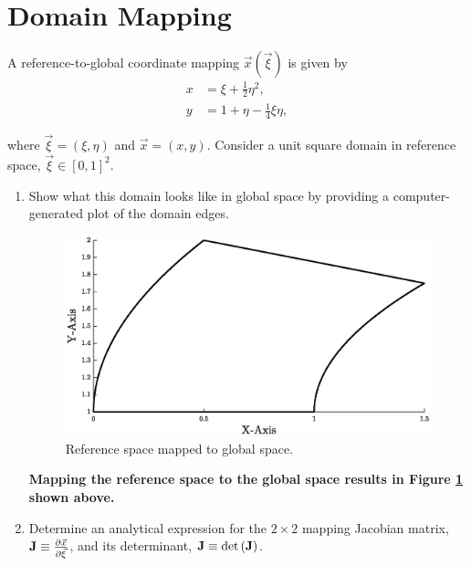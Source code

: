 \pagebreak
\section{Domain Mapping}
A reference-to-global coordinate mapping $\vec{x}\left(\vec{\xi}\right)$ is given by
\begin{align*}
    x & = \xi + \frac{1}{2}\eta^2,\\
    y & = 1 + \eta - \frac{1}{4}\xi\eta,
\end{align*}

where $\vec{\xi} = \left(\xi, \eta\right)$ and $\vec{x} = \left(x,y\right)$. Consider a unit square domain in reference space, $\vec{\xi}\in [0,1]^2$.

\begin{enumerate}[label = \alph*., start = 1]
    \item Show what this domain looks like in global space by providing a computer-generated plot of the domain edges.
    
    \begin{figure}[h]
        \centering
        \includegraphics[width = 0.6\linewidth]{q3/domain.eps}
        \caption{Reference space mapped to global space.}
        \label{fig:q3_refspace}
    \end{figure}

    \begin{fminipage}{0.8\linewidth}
        \textbf{Mapping the reference space to the global space results in Figure \ref{fig:q3_refspace} shown above.}
    \end{fminipage}

    \item Determine  an  analytical  expression  for  the  $2\times2$  mapping  Jacobian  matrix, ${\bf J}\equiv \frac{\partial \vec{x}}{\partial \vec{\xi}}$,  and  its determinant, ${\bf J}\equiv \det{\left(\bf J\right)}$.
    

\end{enumerate}
